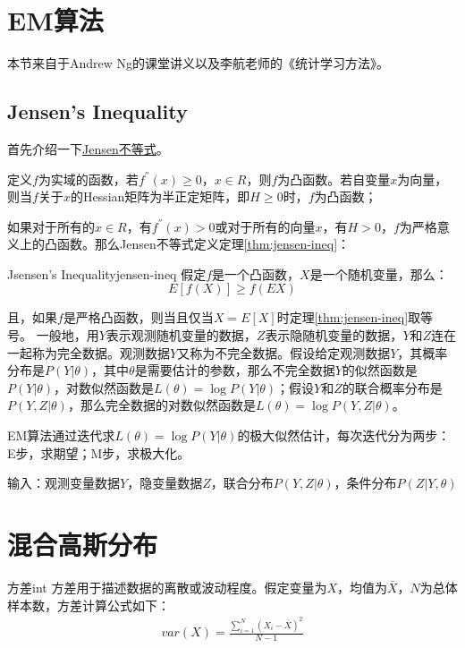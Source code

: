 \section{EM算法}
\label{sec:em}
本节来自于Andrew Ng的课堂讲义以及李航老师的《统计学习方法》。

\subsection{Jensen's Inequality}
首先介绍一下\href{https://en.wikipedia.org/wiki/Jensen\%27s_inequality}{Jensen不等式}。

定义$f$为实域的函数，若$f^{''}(x) \geq 0$，$x\in{R}$，则$f$为凸函数。若自变量$x$为向量，则当$f$关于$x$的Hessian矩阵为半正定矩阵，即$H \geq 0$时，$f$为凸函数；

如果对于所有的$x\in{R}$，有$f^{''}(x)>0$或对于所有的向量$x$，有$H>0$，$f$为严格意义上的凸函数。那么Jensen不等式定义定理\ref{thm:jensen-ineq}：
\begin{theorem}{Jsensen's Inequality}{jensen-ineq}
假定$f$是一个凸函数，$X$是一个随机变量，那么：
\begin{equation}
E[f(X)] \geq f(EX)
\end{equation}
\end{theorem}

且，如果$f$是严格凸函数，则当且仅当$X=E[X]$时定理\ref{thm:jensen-ineq}取等号。
一般地，用$Y$表示观测随机变量的数据，$Z$表示隐随机变量的数据，$Y$和$Z$连在一起称为完全数据。观测数据$Y$又称为不完全数据。假设给定观测数据$Y$，其概率分布是$P(Y|\theta)$，其中$\theta$是需要估计的参数，那么不完全数据$Y$的似然函数是$P(Y|\theta)$，对数似然函数是$L(\theta)=\log P(Y|\theta)$；假设$Y$和$Z$的联合概率分布是$P(Y,Z|\theta)$，那么完全数据的对数似然函数是$L(\theta)=\log P(Y,Z|\theta)$。

EM算法通过迭代求$L(\theta)=\log P(Y|\theta)$的极大似然估计，每次迭代分为两步：E步，求期望；M步，求极大化。

输入：观测变量数据$Y$，隐变量数据$Z$，联合分布$P(Y,Z|\theta)$，条件分布$P(Z|Y,\theta)$

\section{混合高斯分布}

\begin{definition}{方差}{int}
方差用于描述数据的离散或波动程度。假定变量为$X$，均值为$\bar{X}$，$N$为总体样本数，方差计算公式如下：
\begin{align}
var(X) = \frac{\sum_{i=1}^{N}(X_i-\bar{X})^{2}}{N-1}
\end{align}
\end{definition}

